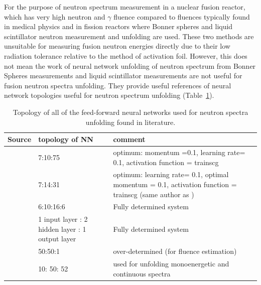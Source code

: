 \documentclass[a4paper, 12pt]{article}
\begin{document}
For the purpose of neutron spectrum measurement in a nuclear fusion reactor, which has very high neutron and $\gamma$ fluence compared to fluences typically found in medical physics and in fission reactors where Bonner spheres and liquid scintillator neutron measurement and unfolding are used. These two methods are unsuitable for measuring fusion neutron energies directly due to their low radiation tolerance relative to the method of activation foil. However, this does not mean the work of neural network unfolding of neutron spectrum from Bonner Spheres measurements
\cite{Rodrigues-UnfoldingCompuerCodeBasedOnANN} %
\cite{RDANNM} %
\cite{ANNDoseQuantitiesPrediction} %
\cite{ClaudiaC.BonnerSphereNNUnfolding} %
and liquid scintillator measurements
\cite{ANN-ModifiedLeastSquare} %
are not useful for fusion neutron spectra unfolding. They provide useful references of neural network topologies useful for neutron spectrum unfolding (Table~\ref{NNtopology}).

\begin{table}
\begin{tabularx}{\textwidth}{cXX}
Source & topology of NN & comment \\
\hline
\cite{Rodrigues-UnfoldingCompuerCodeBasedOnANN} & 7:10:75 & optimum: momentum =0.1, learning rate= 0.1, activation function = trainscg\\
\cite{RDANNM} & 7:14:31 & optimum: learning rate= 0.1, optimal momentum = 0.1, activation function = trainscg (same author as \cite{Rodrigues-UnfoldingCompuerCodeBasedOnANN})\\
\cite{ANNDoseQuantitiesPrediction} & 6:10:16:6 & Fully determined system \\
\cite{ANN-ModifiedLeastSquare} & 1 input layer : 2 hidden layer : 1 output layer & Fully determined system \\
\cite{LancasterNN} & 50:50:1 & over-determined (for fluence estimation)\\
\cite{ClaudiaC.BonnerSphereNNUnfolding} & 10: 50: 52 & used for unfolding monoenergetic and continuous spectra\\
\end{tabularx}
\caption{Topology of all of the feed-forward neural networks used for neutron spectra unfolding found in literature.}\label{NNtopology}
\end{table}
\end{document}
